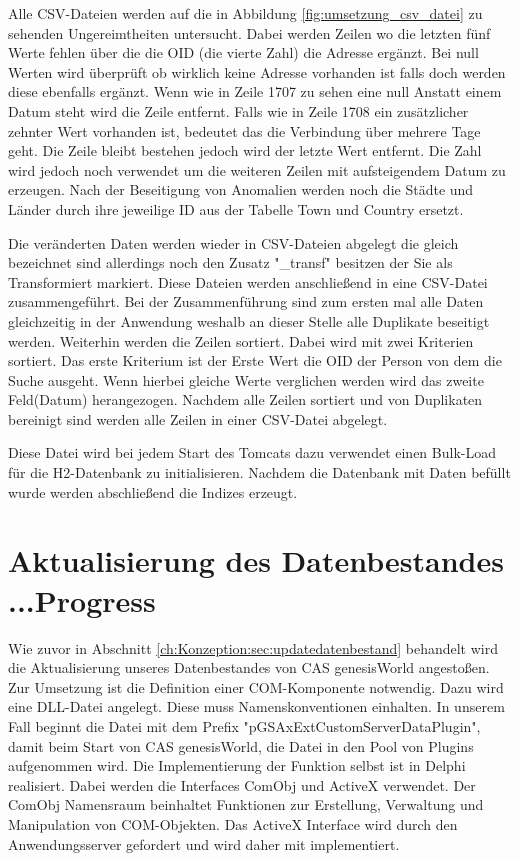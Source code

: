 Alle CSV-Dateien werden auf die in Abbildung \ref{fig:umsetzung_csv_datei} zu sehenden Ungereimtheiten untersucht. Dabei werden Zeilen wo die letzten fünf Werte fehlen über die die OID (die vierte Zahl) die Adresse ergänzt. Bei null Werten wird überprüft ob wirklich keine Adresse vorhanden ist falls doch werden diese ebenfalls ergänzt. Wenn wie in Zeile 1707 zu sehen eine null Anstatt einem Datum steht wird die Zeile entfernt. Falls wie in Zeile 1708 ein zusätzlicher zehnter Wert vorhanden ist, bedeutet das die Verbindung über mehrere Tage geht. Die Zeile bleibt bestehen jedoch wird der letzte Wert entfernt. Die Zahl wird jedoch noch verwendet um die weiteren Zeilen mit aufsteigendem Datum zu erzeugen. Nach der Beseitigung von Anomalien werden noch die Städte und Länder durch ihre jeweilige ID aus der Tabelle Town und Country ersetzt.

Die veränderten Daten werden wieder in CSV-Dateien abgelegt die gleich bezeichnet sind allerdings noch den Zusatz "\_transf" besitzen der Sie als Transformiert  markiert. Diese Dateien werden anschließend in eine CSV-Datei zusammengeführt. Bei der Zusammenführung sind zum ersten mal alle Daten gleichzeitig in der Anwendung weshalb an dieser Stelle alle Duplikate beseitigt werden. Weiterhin werden die Zeilen sortiert. Dabei wird mit zwei Kriterien sortiert. Das erste Kriterium ist der Erste Wert die OID der Person von dem die Suche ausgeht. Wenn hierbei gleiche Werte verglichen werden wird das zweite Feld(Datum) herangezogen. Nachdem alle Zeilen sortiert und von Duplikaten bereinigt sind werden alle Zeilen in einer CSV-Datei abgelegt. 

Diese Datei wird bei jedem Start des Tomcats dazu verwendet einen Bulk-Load für die H2-Datenbank zu initialisieren. Nachdem die Datenbank mit Daten befüllt wurde werden abschließend die Indizes erzeugt.


\section{Aktualisierung des Datenbestandes ...Progress}

Wie zuvor in Abschnitt \ref{ch:Konzeption:sec:updatedatenbestand} behandelt wird die Aktualisierung unseres Datenbestandes von CAS genesisWorld angestoßen. Zur Umsetzung ist die Definition einer COM-Komponente notwendig. Dazu wird eine DLL-Datei angelegt. Diese muss Namenskonventionen einhalten. In unserem Fall beginnt die Datei mit dem Prefix "pGSAxExtCustomServerDataPlugin", damit beim Start von CAS genesisWorld, die Datei in den Pool von Plugins aufgenommen wird. Die Implementierung der Funktion selbst ist in Delphi realisiert. Dabei werden die Interfaces ComObj und ActiveX verwendet. Der ComObj Namensraum beinhaltet Funktionen zur Erstellung, Verwaltung und Manipulation von COM-Objekten. Das ActiveX Interface wird durch den Anwendungsserver gefordert und wird daher mit implementiert. 

